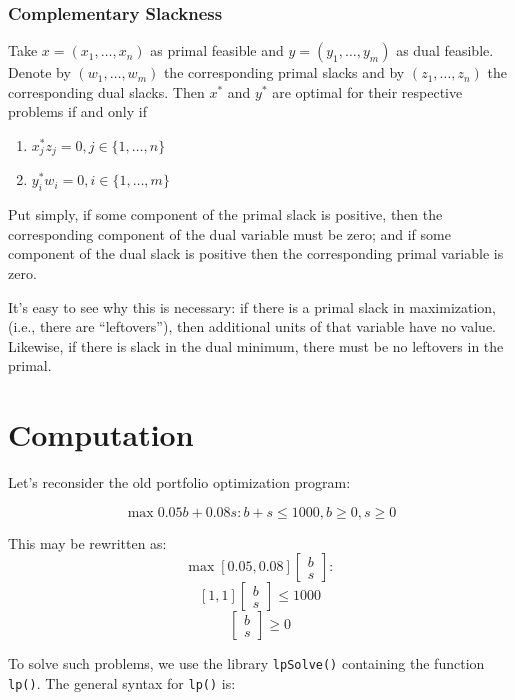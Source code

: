 \documentclass[11pt,]{article}
\providecommand{\tightlist}{%
  \setlength{\itemsep}{0pt}\setlength{\parskip}{0pt}}
\begin{document}
\subsubsection{Complementary Slackness}\label{complementary-slackness}

Take \(x = (x_1,\hdots, x_n)\) as primal feasible and
\(y = (y_1,\hdots, y_m)\) as dual feasible. Denote by
\((w_1,\hdots,w_m)\) the corresponding primal slacks and by
\((z_1,\hdots,z_n)\) the corresponding dual slacks. Then \(x^*\) and
\(y^*\) are optimal for their respective problems if and only if

\begin{enumerate}
\def\labelenumi{\arabic{enumi}.}
\tightlist
\item
  \(x^*_jz_j = 0, j \in \{1,\hdots,n\}\)
\item
  \(y^*_iw_i = 0, i \in \{1,\hdots,m\}\)
\end{enumerate}

Put simply, if some component of the primal slack is positive, then the
corresponding component of the dual variable must be zero; and if some
component of the dual slack is positive then the corresponding primal
variable is zero.

It's easy to see why this is necessary: if there is a primal slack in
maximization, (i.e., there are ``leftovers''), then additional units of
that variable have no value. Likewise, if there is slack in the dual
minimum, there must be no leftovers in the primal.

\section{Computation}\label{computation}

Let's reconsider the old portfolio optimization program:

\[\max 0.05b+0.08s: b+s\leq 1000, b \geq 0, s \geq 0\]

This may be rewritten as:
\[\max{} [0.05, 0.08]\begin{bmatrix}b\\s\end{bmatrix}:\]
\[[1,1]\begin{bmatrix}b\\s\end{bmatrix}\leq 1000\]
\[\begin{bmatrix}b\\s\end{bmatrix}\geq 0\]

To solve such problems, we use the library \texttt{lpSolve()} containing
the function \texttt{lp()}. The general syntax for \texttt{lp()} is:
\end{document}
